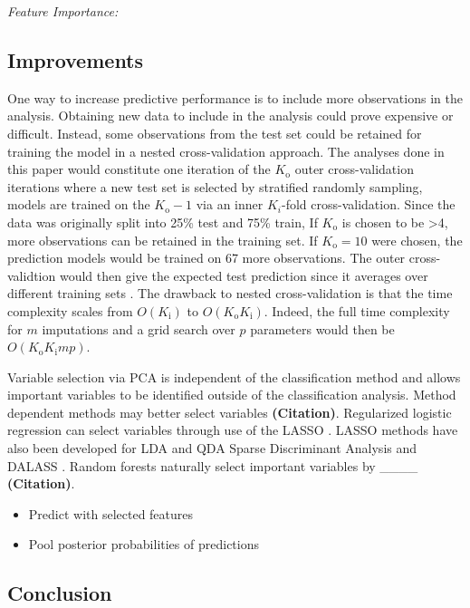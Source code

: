 \documentclass[12pt,]{article}
\providecommand{\tightlist}{%
  \setlength{\itemsep}{0pt}\setlength{\parskip}{0pt}}
\begin{document}
\emph{Feature Importance:}

\subsection{Improvements}\label{improvements}

One way to increase predictive performance is to include more
observations in the analysis. Obtaining new data to include in the
analysis could prove expensive or difficult. Instead, some observations
from the test set could be retained for training the model in a nested
cross-validation approach. The analyses done in this paper would
constitute one iteration of the \(K_\text{o}\) outer cross-validation
iterations where a new test set is selected by stratified randomly
sampling, models are trained on the \(K_\text{o}-1\) via an inner
\(K_{i}\)-fold cross-validation. Since the data was originally split
into 25\% test and 75\% train, If \(K_\text{o}\) is chosen to be
\textgreater{}4, more observations can be retained in the training set.
If \(K_\text{o}=10\) were chosen, the prediction models would be trained
on 67 more observations. The outer cross-validtion would then give the
expected test prediction since it averages over different training sets
\citep{hastie_elements_2009}. The drawback to nested cross-validation is
that the time complexity scales from \(O(K_\text{i})\) to
\(O(K_\text{o}K_\text{i})\). Indeed, the full time complexity for \(m\)
imputations and a grid search over \(p\) parameters would then be
\(O(K_\text{o}K_\text{i}mp)\).

Variable selection via PCA is independent of the classification method
and allows important variables to be identified outside of the
classification analysis. Method dependent methods may better select
variables \textbf{(Citation)}. Regularized logistic regression can
select variables through use of the LASSO
\citep{tibshirani_regression_1996}. LASSO methods have also been
developed for LDA and QDA Sparse Discriminant Analysis
\citep{clemmensen_sparse_2011} and DALASS
\citep{trendafilov_dalass:_2007}. Random forests naturally select
important variables by \_\_\_\_ \textbf{(Citation)}.

\begin{itemize}
\tightlist
\item
  Predict with selected features
\item
  Pool posterior probabilities of predictions
\end{itemize}

\subsection{Conclusion}\label{conclusion}
\end{document}
